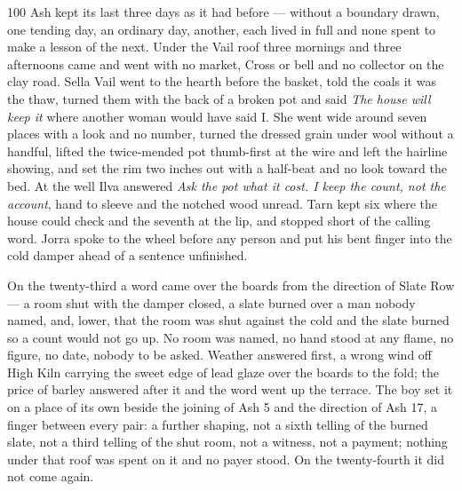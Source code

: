
\scenebreak


\scenebreak


\scenebreak

\CRtailpiece
\begin{CRchronicle}{100}
Ash kept its last three days as it had before — without a boundary drawn, one tending day, an ordinary day, another, each lived in full and none spent to make a lesson of the next. Under the Vail roof three mornings and three afternoons came and went with no market, Cross or bell and no collector on the clay road. Sella Vail went to the hearth before the basket, told the coals it was the thaw, turned them with the back of a broken pot and said \emph{The house will keep it} where another woman would have said I. She went wide around seven places with a look and no number, turned the dressed grain under wool without a handful, lifted the twice-mended pot thumb-first at the wire and left the hairline showing, and set the rim two inches out with a half-beat and no look toward the bed. At the well Ilva answered \emph{Ask the pot what it cost. I keep the count, not the account}, hand to sleeve and the notched wood unread. Tarn kept six where the house could check and the seventh at the lip, and stopped short of the calling word. Jorra spoke to the wheel before any person and put his bent finger into the cold damper ahead of a sentence unfinished.

On the twenty-third a word came over the boards from the direction of Slate Row — a room shut with the damper closed, a slate burned over a man nobody named, and, lower, that the room was shut against the cold and the slate burned so a count would not go up. No room was named, no hand stood at any flame, no figure, no date, nobody to be asked. Weather answered first, a wrong wind off High Kiln carrying the sweet edge of lead glaze over the boards to the fold; the price of barley answered after it and the word went up the terrace. The boy set it on a place of its own beside the joining of Ash 5 and the direction of Ash 17, a finger between every pair: a further shaping, not a sixth telling of the burned slate, not a third telling of the shut room, not a witness, not a payment; nothing under that roof was spent on it and no payer stood. On the twenty-fourth it did not come again.


\end{CRchronicle}
